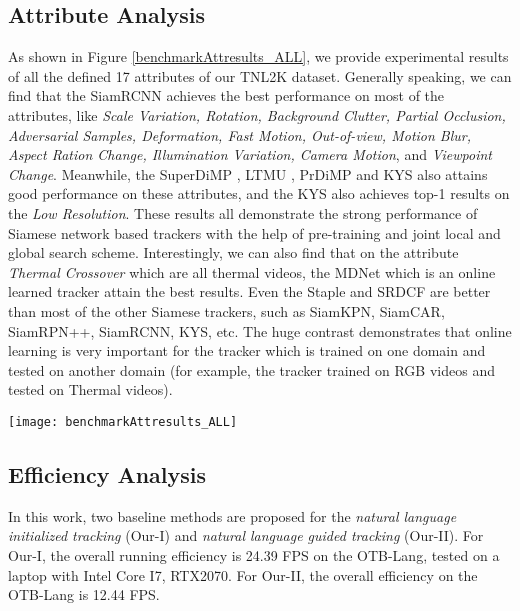 \documentclass[final]{cvpr}
\begin{document}
\subsection{Attribute Analysis } 
As shown in Figure \ref{benchmarkAttresults_ALL}, we provide experimental results of all the defined 17 attributes of our TNL2K dataset. Generally speaking, we can find that the SiamRCNN  \cite{voigtlaender2020siamRCNN} achieves the best performance on most of the attributes, like \emph{Scale Variation, Rotation, Background Clutter, Partial Occlusion, Adversarial Samples, Deformation, Fast Motion, Out-of-view, Motion Blur, Aspect Ration Change, Illumination Variation, Camera Motion}, and \emph{Viewpoint Change}. Meanwhile, the SuperDiMP \cite{bhat2019DiMP}, LTMU \cite{dai2020ltmu}, PrDiMP \cite{danelljan2020PRDiMP} and KYS  \cite{Goutam2020KYS} also attains good performance on these attributes, and the KYS also achieves top-1 results on the \emph{Low Resolution}. These results all demonstrate the strong performance of Siamese network based trackers with the help of pre-training and joint local and global search scheme. Interestingly, we can also find that on the attribute \emph{Thermal Crossover} which are all thermal videos, the MDNet \cite{Nam2015Learning} which is an online learned tracker attain the best results. Even the Staple and SRDCF are better than most of the other Siamese trackers, such as SiamKPN, SiamCAR, SiamRPN++, SiamRCNN, KYS, etc. The huge contrast demonstrates that online learning is very important for the tracker which is trained on one domain and tested on another domain (for example, the tracker trained on RGB videos and tested on Thermal videos). 


\begin{figure*}[!htb]
\center
\texttt{[image: benchmarkAttresults\_ALL]}
\caption{Tracking results under each challenging factors on TNL2K dataset (Tracking-by-BBox). Best viewed by zooming in.}
\label{benchmarkAttresults_ALL}
\end{figure*} 	







\subsection{Efficiency Analysis} 
In this work, two baseline methods are proposed for the \emph{natural language initialized tracking} (Our-I) and \emph{natural language guided tracking} (Our-II). 
For Our-I, the overall running efficiency is 24.39 FPS on the OTB-Lang, tested on a laptop with Intel Core I7, RTX2070.  
For Our-II, the overall efficiency on the OTB-Lang is 12.44 FPS. 
\end{document}
